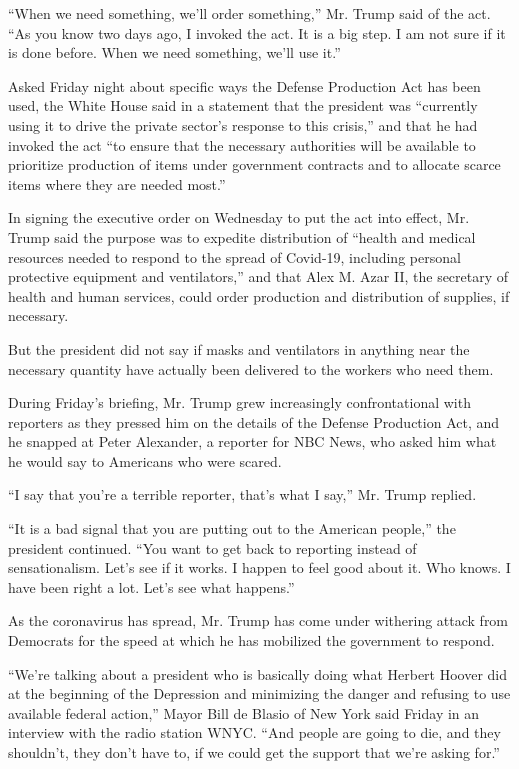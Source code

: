 ``When we need something, we'll order something,'' Mr. Trump said of the
act. ``As you know two days ago, I invoked the act. It is a big step. I
am not sure if it is done before. When we need something, we'll use
it.''

Asked Friday night about specific ways the Defense Production Act has
been used, the White House said in a statement that the president was
``currently using it to drive the private sector's response to this
crisis,'' and that he had invoked the act ``to ensure that the necessary
authorities will be available to prioritize production of items under
government contracts and to allocate scarce items where they are needed
most.''

In signing the executive order on Wednesday to put the act into effect,
Mr. Trump said the purpose was to expedite distribution of ``health and
medical resources needed to respond to the spread of Covid-19, including
personal protective equipment and ventilators,'' and that Alex M. Azar
II, the secretary of health and human services, could order production
and distribution of supplies, if necessary.

But the president did not say if masks and ventilators in anything near
the necessary quantity have actually been delivered to the workers who
need them.

During Friday's briefing, Mr. Trump grew increasingly confrontational
with reporters as they pressed him on the details of the Defense
Production Act, and he snapped at Peter Alexander, a reporter for NBC
News, who asked him what he would say to Americans who were scared.

``I say that you're a terrible reporter, that's what I say,'' Mr. Trump
replied.

``It is a bad signal that you are putting out to the American people,''
the president continued. ``You want to get back to reporting instead of
sensationalism. Let's see if it works. I happen to feel good about it.
Who knows. I have been right a lot. Let's see what happens.''

As the coronavirus has spread, Mr. Trump has come under withering attack
from Democrats for the speed at which he has mobilized the government to
respond.

``We're talking about a president who is basically doing what Herbert
Hoover did at the beginning of the Depression and minimizing the danger
and refusing to use available federal action,'' Mayor Bill de Blasio of
New York said Friday in an interview with the radio station WNYC. ``And
people are going to die, and they shouldn't, they don't have to, if we
could get the support that we're asking for.''

